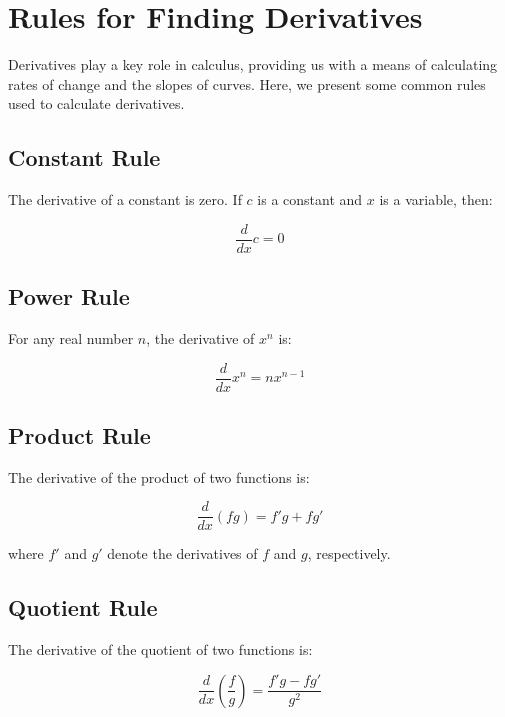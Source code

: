 \chapter{Rules for Finding Derivatives}


Derivatives play a key role in calculus, providing us with a means of
calculating rates of change and the slopes of curves. Here, we present
some common rules used to calculate derivatives.

\section{Constant Rule}

The derivative of a constant is zero. If $c$ is a constant and $x$ is
a variable, then:

\begin{equation}
\frac{d}{dx}c = 0
\end{equation}

\section{Power Rule}

For any real number $n$, the derivative of $x^n$ is:

\begin{equation}
\frac{d}{dx}x^n = nx^{n-1}
\end{equation}

\section{Product Rule}

The derivative of the product of two functions is:

\begin{equation}
\frac{d}{dx}(fg) = f'g + fg'
\end{equation}

where $f'$ and $g'$ denote the derivatives of $f$ and $g$,
respectively.

\section{Quotient Rule}

The derivative of the quotient of two functions is:

\begin{equation}
\frac{d}{dx}\left(\frac{f}{g}\right) = \frac{f'g - fg'}{g^2}
\end{equation}

